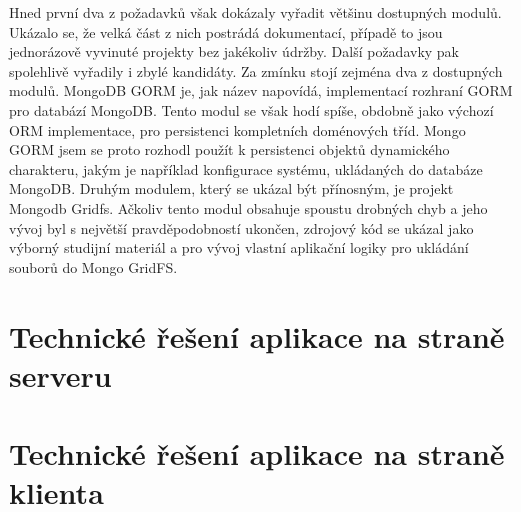 Hned první dva z požadavků však dokázaly vyřadit většinu dostupných modulů. Ukázalo se, že velká část z nich postrádá dokumentací, případě  to jsou jednorázově vyvinuté projekty bez jakékoliv údržby. Další požadavky pak spolehlivě vyřadily i zbylé kandidáty. Za zmínku stojí zejména dva z dostupných modulů. MongoDB GORM je, jak název napovídá, implementací rozhraní GORM pro databází MongoDB. Tento modul se však hodí spíše, obdobně jako výchozí ORM implementace, pro persistenci kompletních doménových tříd. Mongo GORM jsem se proto rozhodl použít k persistenci objektů dynamického charakteru, jakým je například konfigurace systému, ukládaných do databáze MongoDB. Druhým modulem, který se ukázal být přínosným, je projekt Mongodb Gridfs. Ačkoliv tento modul obsahuje spoustu drobných chyb a jeho vývoj byl s největší pravděpodobností ukončen, zdrojový kód se ukázal jako výborný studijní materiál a pro vývoj vlastní aplikační logiky pro ukládání souborů do Mongo GridFS.

\section{Technické řešení aplikace na straně serveru}
\blindtext[2]

\section{Technické řešení aplikace na straně klienta}
\blindtext[2]
